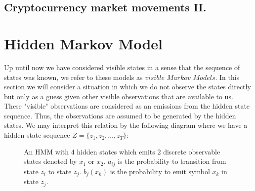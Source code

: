 \subsection{Cryptocurrency market movements II.}

\section{Hidden Markov Model}

Up until now we have considered visible states in a sense that the sequence of states was known, we refer to these models as $visible$ $Markov$ $Models$. In this section we will consider a situation in which we do not observe the states directly but only as a guess given other visible observations that are available to us. These "visible" observations are considered as an emissions from the hidden state sequence. Thus, the observations are assumed to be generated by the hidden states. We may interpret this relation by the following diagram where we have a hidden state sequence $Z = \{z_1,z_2,\ldots,z_T\}$:

\begin{figure}[htbp]
\begin{center}
\end{center}
\caption{An HMM with 4 hidden states which emits 2 discrete observable states denoted by $x_1$ or $x_2$.
$a_{ij}$ is the probability to transition from state $z_i$ to state $z_j$.
$b_j(x_k)$ is the probability to emit symbol $x_k$ in state $z_j$.}
\end{figure}

